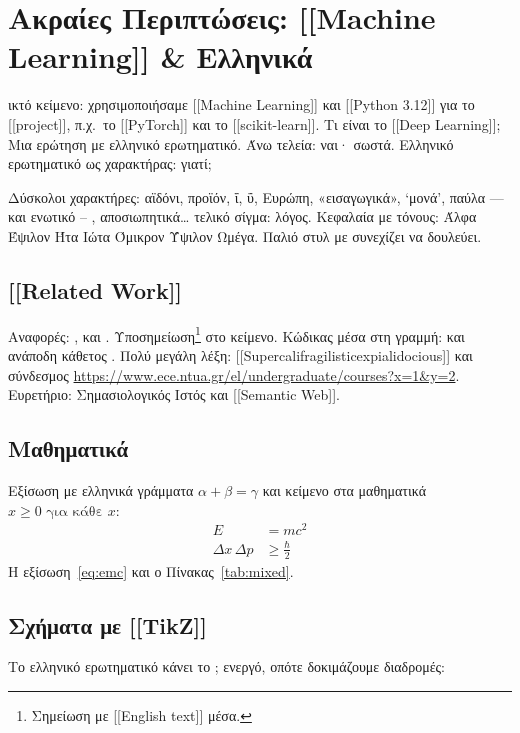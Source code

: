 \chapter{Ακραίες Περιπτώσεις: [[Machine Learning]] \& Ελληνικά}
ικτό κείμενο: χρησιμοποιήσαμε [[Machine Learning]] και
[[Python 3.12]] για το [[project]], π.χ.\ το [[PyTorch]] και το [[scikit-learn]].
Τι είναι το [[Deep Learning]]; Μια ερώτηση με ελληνικό ερωτηματικό.
Άνω τελεία: ναι· σωστά. Ελληνικό ερωτηματικό ως χαρακτήρας: γιατί;

Δύσκολοι χαρακτήρες: αϊδόνι, προϊόν, ΐ, ΰ, Ευρώπη, «εισαγωγικά», ‘μονά’,
παύλα --- και ενωτικό -- , αποσιωπητικά\dots{} τελικό σίγμα: λόγος.
Κεφαλαία με τόνους: Άλφα Έψιλον Ήτα Ιώτα Όμικρον Ύψιλον Ωμέγα.
Παλιό στυλ με  συνεχίζει να δουλεύει.

\section{[[Related Work]]}
Αναφορές: \cite{goossens93}, \cite{greekbook} και \cite{LiArTs13}.
Υποσημείωση\footnote{Σημείωση με [[English text]] μέσα.} στο κείμενο.
Κώδικας μέσα στη γραμμή:  και ανάποδη κάθετος \bkslash.
Πολύ μεγάλη λέξη: [[Supercalifragilisticexpialidocious]] και σύνδεσμος
\url{https://www.ece.ntua.gr/el/undergraduate/courses?x=1&y=2}.
Ευρετήριο: Σημασιολογικός Ιστός και
[[Semantic Web]].

\section{Μαθηματικά}
Εξίσωση με ελληνικά γράμματα $\alpha + \beta = \gamma$ και κείμενο στα
μαθηματικά $x \geq 0 \text{ για κάθε } x$:
\begin{align}
	E &= m c^2 \label{eq:emc} \\
	\Delta x \, \Delta p &\geq \frac{\hbar}{2}
\end{align}
Η εξίσωση~\eqref{eq:emc} και ο Πίνακας~\ref{tab:mixed}.

\section{Σχήματα με [[TikZ]]}
Το ελληνικό ερωτηματικό κάνει το ; ενεργό, οπότε δοκιμάζουμε διαδρομές:
\begin{center}
\end{center}


